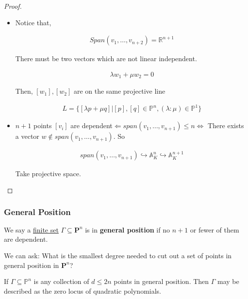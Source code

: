 \documentclass[Total.tex]{subfiles}
\begin{document}
			\begin{proof}
				\begin{itemize}
					\item Notice that,
					
					\begin{gather*}
						Span(v_1,\dots,v_{n+2})=\mathbb{R}^{n+1}
					\end{gather*} 
					
					There must be two vectors which are not linear independent. 
					
					\begin{gather*}
						\lambda w_1+\mu w_2=0
					\end{gather*}
					
					Then, $[w_1],[w_2]$ are on the same projective line
					
					\begin{gather*}
						L=\{[\lambda p+\mu q]|[p],[q]\in \mathbb{P}^n,(\lambda:\mu)\in \mathbb{P}^1\}
					\end{gather*}
					
					\item $n+1$ points $[v_i]$ are dependent$\Leftarrow span(v_1,\dots,v_{n+1})\leq n\Leftrightarrow $ There exists a vector $w\notin span(v_1,\dots,v_{n+1})$. So 
					
					\begin{gather*}
						span(v_1,\dots,v_{n+1})\hookrightarrow \mathbb{A}^n_K\hookrightarrow \mathbb{A}^{n+1}_K
					\end{gather*}
					
					Take projective space.
				\end{itemize}
			\end{proof}
			
			\subsubsection{General Position}
			
			\begin{Def}
				We say a \underline{finite set} $\Gamma\subseteq \mathbf{P}^n$ is in \textbf{general position} if no $n+1$ or fewer of them are dependent.
			\end{Def}
			
			We can ask: What is the smallest degree needed to cut out a set of points in general position in $\mathbf{P}^n$?
			
			\begin{theorem}
				If $\Gamma\subseteq \mathbb{P}^n$ is any collection of $d\leq 2n$ points in general position. Then $\Gamma$ may be described as the zero locus of quadratic polynomials.
			\end{theorem}
			
\end{document}
